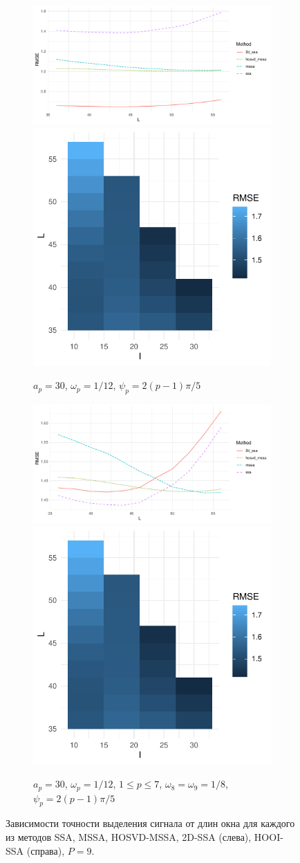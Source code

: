 \documentclass[specialist,
  substylefile=spbu.rtx,
subf,href,colorlinks=true, 12pt]{disser}
\theoremstyle{plain}
\theoremstyle{definition}
\theoremstyle{remark}
\begin{document}
\begin{figure}[!h]
\begin{subfigure}{.836\linewidth}
  \end{subfigure} \par\medskip
  \begin{subfigure}{.836\linewidth}
    \includegraphics[width=.66\linewidth]{nine-series-third}\hfill
    \includegraphics[width=.34\linewidth]{nine-series-third_hooi}
    \caption{$a_p = 30$, $\omega_p=1/12$, $\psi_p=2(p-1)\pi/5$}
  \end{subfigure} \par\medskip
  \begin{subfigure}{.836\linewidth}
    \includegraphics[width=.66\linewidth]{nine-series-fourth}\hfill
    \includegraphics[width=.34\linewidth]{nine-series-fourth_hooi}
    \caption{$a_p = 30$, $\omega_p=1/12$, $1 \leqslant p \leqslant 7$,
    $\omega_8=\omega_9=1/8$, $\psi_p=2(p-1)\pi/5$}
  \end{subfigure}
  \caption{Зависимости точности выделения сигнала от длин окна для каждого из методов
  SSA, MSSA, HOSVD-MSSA, 2D-SSA (слева), HOOI-SSA (справа), $P=9$.}
  \label{fig:nine-series-example}
\end{figure}
\end{document}
